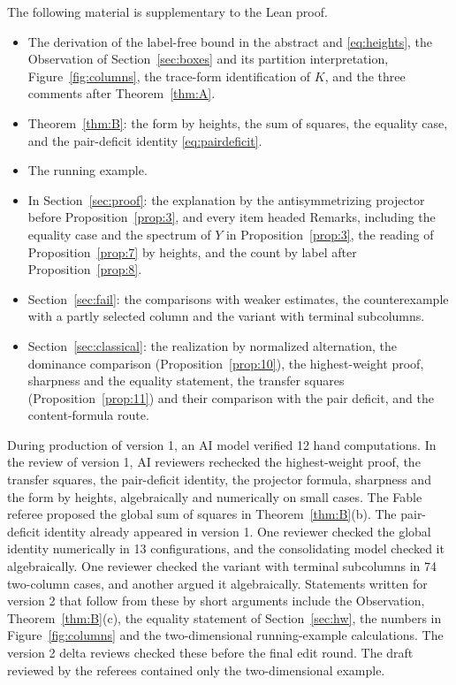 \documentclass[11pt]{amsart}
\theoremstyle{definition}
\theoremstyle{remark}
\begin{document}
The following material is supplementary to the Lean proof.
\begin{itemize}
\item The derivation of the label-free bound in the abstract and
  \eqref{eq:heights}, the Observation of Section~\ref{sec:boxes} and its
  partition interpretation, Figure~\ref{fig:columns}, the trace-form
  identification of \(K\), and the three comments after Theorem~\ref{thm:A}.
\item Theorem~\ref{thm:B}: the form by heights, the sum of squares, the
  equality case, and the pair-deficit identity \eqref{eq:pairdeficit}.
\item The running example.
\item In Section~\ref{sec:proof}: the explanation by the antisymmetrizing
  projector before Proposition~\ref{prop:3}, and every item headed Remarks,
  including the equality case and the spectrum of \(Y\) in
  Proposition~\ref{prop:3}, the reading of Proposition~\ref{prop:7} by
  heights, and the count by label after Proposition~\ref{prop:8}.
\item Section~\ref{sec:fail}: the comparisons with weaker estimates, the
  counterexample with a partly selected column and the variant with
  terminal subcolumns.
\item Section~\ref{sec:classical}: the realization by normalized
  alternation, the dominance comparison (Proposition~\ref{prop:10}), the
  highest-weight proof, sharpness and the equality statement, the transfer
  squares (Proposition~\ref{prop:11}) and their comparison with the pair
  deficit, and the content-formula route.
\end{itemize}
During production of version 1, an AI model
verified 12 hand computations. In the review of version 1, AI reviewers
rechecked the highest-weight proof, the transfer squares, the pair-deficit
identity, the projector formula, sharpness and the form by heights, algebraically
and numerically on small cases. The Fable referee proposed the global sum
of squares in Theorem~\ref{thm:B}(b). The pair-deficit identity already
appeared in version 1. One reviewer checked the global identity numerically
in 13 configurations, and the consolidating model checked it algebraically.
One reviewer checked the
variant with terminal subcolumns in 74 two-column cases, and another argued
it algebraically. Statements written for version 2 that follow from these by
short arguments include the Observation, Theorem~\ref{thm:B}(c), the
equality statement of Section~\ref{sec:hw}, the numbers in
Figure~\ref{fig:columns} and the two-dimensional running-example calculations. The
version 2 delta reviews checked these before the final edit round. The
draft reviewed by the referees contained only the two-dimensional example.
\end{document}
